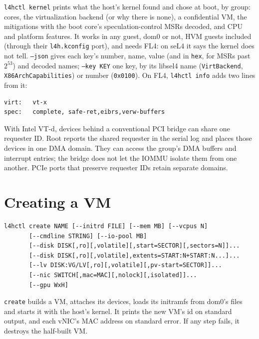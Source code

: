 \documentclass[11pt,a4paper]{report}
\newcommand{\cmd}[1]{\texttt{#1}}
\begin{document}
\cmd{l4hctl kernel} prints what the host's kernel found and chose at
boot, by group: cores, the virtualization backend (or why there is none),
a confidential VM, the mitigations with the boot core's
speculation-control MSRs decoded, and CPU and platform features. It
works in any guest, dom0 or not, HVM guests included (through their
\texttt{l4h.kconfig} port), and needs FL4: on seL4 it says the kernel does
not tell. \cmd{--json} gives each key's number, name, value (and in
\texttt{hex}, for MSRs past $2^{53}$) and decoded names;
\cmd{--key KEY} one key, by its libsel4 name (\texttt{VirtBackend},
\texttt{X86ArchCapabilities}) or number (\texttt{0x0100}). On FL4,
\cmd{l4hctl info} adds two lines from it:
\begin{lstlisting}
virt:   vt-x
spec:   complete, safe-ret,eibrs,verw-buffers
\end{lstlisting}

With Intel VT-d, devices behind a conventional PCI bridge can share one
requester ID. Root reports the shared requester in the serial log and
places those devices in one DMA domain. They can access the group's DMA
buffers and interrupt entries; the bridge does not let the IOMMU isolate
them from one another. PCIe ports that preserve requester IDs retain
separate domains.

\section{Creating a VM}

\begin{lstlisting}
l4hctl create NAME [--initrd FILE] [--mem MB] [--vcpus N]
       [--cmdline STRING] [--io-pool MB]
       [--disk DISK[,ro][,volatile][,start=SECTOR][,sectors=N]]...
       [--disk DISK[,ro][,volatile],extents=START:N+START:N...]...
       [--lv DISK:VG/LV[,ro][,volatile][,pv-start=SECTOR]]...
       [--nic SWITCH[,mac=MAC][,nolock][,isolated]]...
       [--gpu WxH]
\end{lstlisting}

\cmd{create} builds a VM, attaches its devices, loads its initramfs from
dom0's files and starts it with the host's kernel. It prints the new VM's id on
standard output, and each vNIC's MAC address on standard error. If any step
fails, it destroys the half-built VM.
\end{document}
